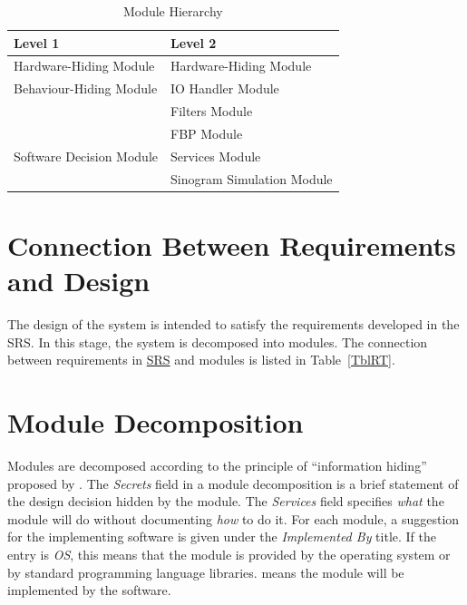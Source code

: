 \documentclass[12pt, titlepage]{article}
\begin{document}
\begin{table}[h!]
\centering
\begin{tabular}{p{} p{}}
\toprule
\textbf{Level 1} & \textbf{Level 2}\\
\midrule
{Hardware-Hiding Module} & Hardware-Hiding Module \\
\midrule

{Behaviour-Hiding Module} & IO Handler Module\\
& Filters Module\\
& FBP Module\\
\midrule

{Software Decision Module} & Services Module\\
& Sinogram Simulation Module\\
\bottomrule

\end{tabular}
\caption{Module Hierarchy}
\label{TblMH}
\end{table}

\section{Connection Between Requirements and Design} \label{SecConnection}

The design of the system is intended to satisfy the requirements developed in
the SRS. In this stage, the system is decomposed into modules. The connection
between requirements in \href{https://github.com/marischan888/FBP-CT/blob/main/docs/SRS/SRS.pdf}{SRS} and modules is listed in Table~\ref{TblRT}.

\section{Module Decomposition} \label{SecMD}

Modules are decomposed according to the principle of ``information hiding''
proposed by \citet{ParnasEtAl1984}. The \emph{Secrets} field in a module
decomposition is a brief statement of the design decision hidden by the
module. The \emph{Services} field specifies \emph{what} the module will do
without documenting \emph{how} to do it. For each module, a suggestion for the
implementing software is given under the \emph{Implemented By} title. If the
entry is \emph{OS}, this means that the module is provided by the operating
system or by standard programming language libraries.  \emph{\progname{}} means the
module will be implemented by the \progname{} software.
\end{document}
